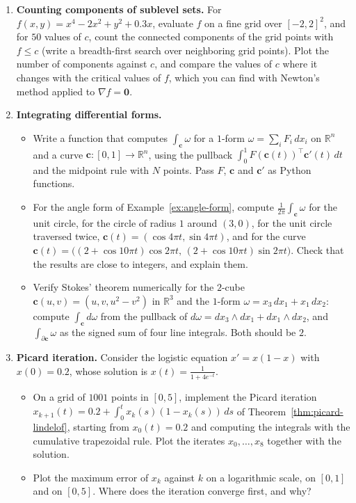 \documentclass[11pt]{article}
\theoremstyle{definition}
\theoremstyle{plain}
\theoremstyle{remark}
\begin{document}
\begin{enumerate}[label=\textbf{P\arabic*.}, leftmargin=*]
    \item \textbf{Counting components of sublevel sets.} For $f(x, y) = x^4 - 2x^2 + y^2 + 0.3x$, evaluate $f$ on a fine grid over $[-2, 2]^2$, and for $50$ values of $c$, count the connected components of the grid points with $f \leq c$ (write a breadth-first search over neighboring grid points). Plot the number of components against $c$, and compare the values of $c$ where it changes with the critical values of $f$, which you can find with Newton's method applied to $\nabla f = \mathbf{0}$.

    \item \textbf{Integrating differential forms.}
    \begin{itemize}
        \item Write a function that computes $\int_{\mathbf{c}} \omega$ for a $1$-form $\omega = \sum_i F_i\, dx_i$ on $\mathbb{R}^n$ and a curve $\mathbf{c}: [0, 1] \to \mathbb{R}^n$, using the pullback $\int_0^1 F(\mathbf{c}(t))^\top\mathbf{c}'(t)\, dt$ and the midpoint rule with $N$ points. Pass $F$, $\mathbf{c}$ and $\mathbf{c}'$ as Python functions.
        \item For the angle form of Example~\ref{ex:angle-form}, compute $\frac{1}{2\pi}\int_{\mathbf{c}} \omega$ for the unit circle, for the circle of radius $1$ around $(3, 0)$, for the unit circle traversed twice, $\mathbf{c}(t) = (\cos 4\pi t, \sin 4\pi t)$, and for the curve $\mathbf{c}(t) = \big((2 + \cos 10\pi t)\cos 2\pi t, \, (2 + \cos 10\pi t)\sin 2\pi t\big)$. Check that the results are close to integers, and explain them.
        \item Verify Stokes' theorem numerically for the $2$-cube $\mathbf{c}(u, v) = (u, v, u^2 - v^2)$ in $\mathbb{R}^3$ and the $1$-form $\omega = x_3\, dx_1 + x_1\, dx_2$: compute $\int_{\mathbf{c}} d\omega$ from the pullback of $d\omega = dx_3 \wedge dx_1 + dx_1 \wedge dx_2$, and $\int_{\partial\mathbf{c}} \omega$ as the signed sum of four line integrals. Both should be $2$.
    \end{itemize}

    \item \textbf{Picard iteration.} Consider the logistic equation $x' = x(1 - x)$ with $x(0) = 0.2$, whose solution is $x(t) = \frac{1}{1 + 4e^{-t}}$.
    \begin{itemize}
        \item On a grid of $1001$ points in $[0, 5]$, implement the Picard iteration $x_{k+1}(t) = 0.2 + \int_0^t x_k(s)(1 - x_k(s))\, ds$ of Theorem~\ref{thm:picard-lindelof}, starting from $x_0(t) = 0.2$ and computing the integrals with the cumulative trapezoidal rule. Plot the iterates $x_0, \ldots, x_8$ together with the solution.
        \item Plot the maximum error of $x_k$ against $k$ on a logarithmic scale, on $[0, 1]$ and on $[0, 5]$. Where does the iteration converge first, and why?
    \end{itemize}


\end{enumerate}
\end{document}
